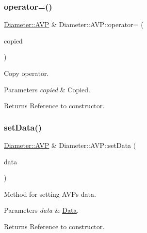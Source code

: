 \subsubsection{\texorpdfstring{operator=()}{operator=()}\hspace{0.1cm}{\footnotesize\ttfamily [2/2]}}
{\footnotesize\ttfamily \hyperlink{classDiameter_1_1AVP}{Diameter\+::\+A\+VP} \& Diameter\+::\+A\+V\+P\+::operator= (\begin{DoxyParamCaption}\item[{const \hyperlink{classDiameter_1_1AVP}{A\+VP} \&}]{copied }\end{DoxyParamCaption})}



Copy operator. 


\begin{DoxyParams}{Parameters}
{\em copied} & Copied. \\
\hline
\end{DoxyParams}
\begin{DoxyReturn}{Returns}
Reference to constructor. 
\end{DoxyReturn}
\mbox{\label{classDiameter_1_1AVP_a9a16f50e09fa18523f6cc72e372949c8}} 
\subsubsection{\texorpdfstring{set\+Data()}{setData()}}
{\footnotesize\ttfamily \hyperlink{classDiameter_1_1AVP}{Diameter\+::\+A\+VP} \& Diameter\+::\+A\+V\+P\+::set\+Data (\begin{DoxyParamCaption}\item[{const \hyperlink{classDiameter_1_1AVP_1_1Data}{Data} \&}]{data }\end{DoxyParamCaption})}



Method for setting A\+V\+Ps data. 


\begin{DoxyParams}{Parameters}
{\em data} & \hyperlink{classDiameter_1_1AVP_1_1Data}{Data}. \\
\hline
\end{DoxyParams}
\begin{DoxyReturn}{Returns}
Reference to constructor. 
\end{DoxyReturn}
\mbox{\label{classDiameter_1_1AVP_a1c275a3973c1d871e0653a1ab5c54499}} 

